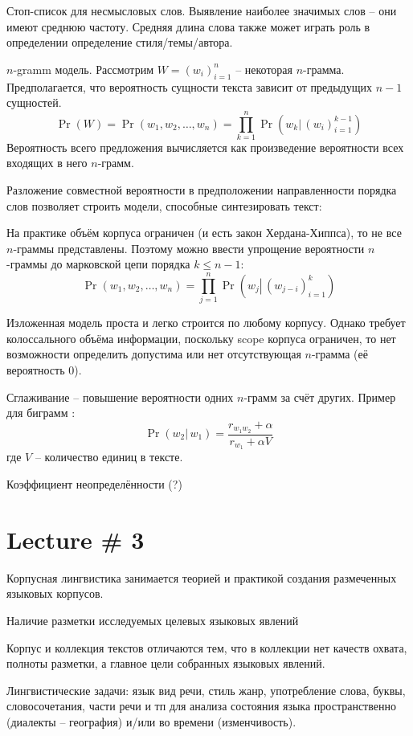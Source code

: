\documentclass[a4paper]{article}
\newcommand{\brac}[1]{{\left ( #1 \right )}}
\newcommand{\induc}[1]{{\left . #1 \right \vert}}
\newcommand{\eng}[1]{\foreignlanguage{english}{#1}}
\begin{document}
Стоп-список для несмысловых слов.
Выявление наиболее значимых слов -- они имеют среднюю частоту.
Средняя длина слова также может играть роль в определении определение стиля/темы/автора.

$n$\eng{-gramm} модель.
Рассмотрим $W = \brac{w_i}_{i=1}^n$ -- некоторая $n$-грамма.
Предполагается, что вероятность сущности текста зависит от предыдущих $n-1$ сущностей.
\[ \Pr(W) = \Pr\brac{w_1,w_2,\ldots,w_n} = \prod_{k=1}^n \Pr\brac{\induc{w_k}\,\brac{w_i}_{i=1}^{k-1}}\]
Вероятность всего предложения вычисляется как произведение вероятности всех входящих в него $n$-грамм.

Разложение совместной вероятности в предположении направленности порядка слов позволяет строить модели, способные синтезировать текст:

На практике объём корпуса ограничен (и есть закон Хердана-Хиппса), то не все $n$-граммы представлены.
Поэтому можно ввести упрощение вероятности $n$-граммы до марковской цепи порядка $k\leq n-1$:
\[\Pr\brac{w_1,w_2,\ldots,w_n} = \prod_{j=1}^n \Pr\brac{\induc{w_j}\,\brac{w_{j-i}}_{i=1}^k}\]

Изложенная модель проста и легко строится по любому корпусу.
Однако требует колоссального объёма информации, поскольку \eng{scope} корпуса ограничен,
то нет возможности определить допустима или нет отсутствующая $n$-грамма (её вероятность $0$).

Сглаживание -- повышение вероятности одних $n$-грамм за счёт других.
Пример для биграмм : \[\Pr\brac{\induc{w_2}\, w_1} = \frac{r_{w_1w_2}+\alpha}{r_{w_1}+\alpha V}\]
где $V$ -- количество единиц в тексте.

Коэффициент неопределённости (?)



\section{Lecture \# 3} %
\label{sec:lecture_3}

Корпусная лингвистика занимается теорией и практикой создания размеченных языковых корпусов.

Наличие разметки исследуемых целевых языковых явлений

Корпус и коллекция текстов отличаются тем, что в коллекции нет качеств охвата, полноты разметки, а главное цели собранных языковых явлений.

Лингвистические задачи: язык вид речи, стиль жанр, употребление слова, буквы, словосочетания, части речи и тп для анализа состояния языка пространственно (диалекты -- география) и/или во времени (изменчивость).
\end{document}
